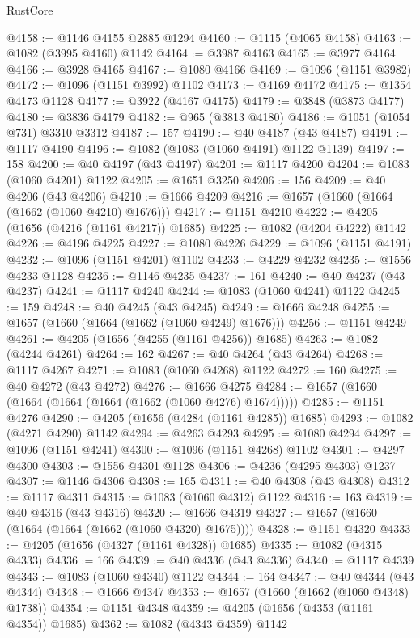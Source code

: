 \begin{lexlean}{RustCore}
\begin{coremodule}
@4158 := @1146 @4155 @2885 @1294
@4160 := @1115 (@4065 @4158)
@4163 := @1082 (@3995 @4160) @1142
@4164 := @3987 @4163
@4165 := @3977 @4164
@4166 := @3928 @4165
@4167 := @1080 @4166
@4169 := @1096 (@1151 @3982)
@4172 := @1096 (@1151 @3992) @1102
@4173 := @4169 @4172
@4175 := @1354 @4173 @1128
@4177 := @3922 (@4167 @4175)
@4179 := @3848 (@3873 @4177)
@4180 := @3836 @4179
@4182 := @965 (@3813 @4180)
@4186 := @1051 (@1054 @731) @3310 @3312
@4187 := 157
@4190 := @40 @4187 (@43 @4187)
@4191 := @1117 @4190
@4196 := @1082 (@1083 (@1060 @4191) @1122 @1139)
@4197 := 158
@4200 := @40 @4197 (@43 @4197)
@4201 := @1117 @4200
@4204 := @1083 (@1060 @4201) @1122
@4205 := @1651 @3250
@4206 := 156
@4209 := @40 @4206 (@43 @4206)
@4210 := @1666 @4209
@4216 := @1657 (@1660 (@1664 (@1662 (@1060 @4210) @1676)))
@4217 := @1151 @4210
@4222 := @4205 (@1656 (@4216 (@1161 @4217)) @1685)
@4225 := @1082 (@4204 @4222) @1142
@4226 := @4196 @4225
@4227 := @1080 @4226
@4229 := @1096 (@1151 @4191)
@4232 := @1096 (@1151 @4201) @1102
@4233 := @4229 @4232
@4235 := @1556 @4233 @1128
@4236 := @1146 @4235
@4237 := 161
@4240 := @40 @4237 (@43 @4237)
@4241 := @1117 @4240
@4244 := @1083 (@1060 @4241) @1122
@4245 := 159
@4248 := @40 @4245 (@43 @4245)
@4249 := @1666 @4248
@4255 := @1657 (@1660 (@1664 (@1662 (@1060 @4249) @1676)))
@4256 := @1151 @4249
@4261 := @4205 (@1656 (@4255 (@1161 @4256)) @1685)
@4263 := @1082 (@4244 @4261)
@4264 := 162
@4267 := @40 @4264 (@43 @4264)
@4268 := @1117 @4267
@4271 := @1083 (@1060 @4268) @1122
@4272 := 160
@4275 := @40 @4272 (@43 @4272)
@4276 := @1666 @4275
@4284 := @1657 (@1660 (@1664 (@1664 (@1664 (@1662 (@1060 @4276) @1674)))))
@4285 := @1151 @4276
@4290 := @4205 (@1656 (@4284 (@1161 @4285)) @1685)
@4293 := @1082 (@4271 @4290) @1142
@4294 := @4263 @4293
@4295 := @1080 @4294
@4297 := @1096 (@1151 @4241)
@4300 := @1096 (@1151 @4268) @1102
@4301 := @4297 @4300
@4303 := @1556 @4301 @1128
@4306 := @4236 (@4295 @4303) @1237
@4307 := @1146 @4306
@4308 := 165
@4311 := @40 @4308 (@43 @4308)
@4312 := @1117 @4311
@4315 := @1083 (@1060 @4312) @1122
@4316 := 163
@4319 := @40 @4316 (@43 @4316)
@4320 := @1666 @4319
@4327 := @1657 (@1660 (@1664 (@1664 (@1662 (@1060 @4320) @1675))))
@4328 := @1151 @4320
@4333 := @4205 (@1656 (@4327 (@1161 @4328)) @1685)
@4335 := @1082 (@4315 @4333)
@4336 := 166
@4339 := @40 @4336 (@43 @4336)
@4340 := @1117 @4339
@4343 := @1083 (@1060 @4340) @1122
@4344 := 164
@4347 := @40 @4344 (@43 @4344)
@4348 := @1666 @4347
@4353 := @1657 (@1660 (@1662 (@1060 @4348) @1738))
@4354 := @1151 @4348
@4359 := @4205 (@1656 (@4353 (@1161 @4354)) @1685)
@4362 := @1082 (@4343 @4359) @1142

\end{coremodule}
\end{lexlean}
